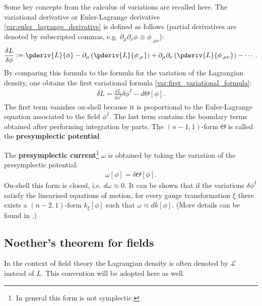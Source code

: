     Some key concepts from the calculus of variations are recalled here. The variational derivative or Euler-Lagrange derivative \eqref{var:euler_lagrange_derivative} is defined as follows (partial derivatives are denoted by subscripted commas, e.g. $\partial_\mu\partial_\nu\phi\equiv\phi_{,\mu\nu}$):
    \begin{gather}
        \frac{\delta L}{\delta \phi} := \pderiv{L}{\phi} - \partial_\mu\left(\pderiv{L}{\phi_{,\mu}}\right) + \partial_\mu\partial_\nu\left(\pderiv{L}{\phi_{,\mu\nu}}\right) -\cdots.
    \end{gather}
    By comparing this formula to the formula for the variation of the Lagrangian density, one obtains the first variational formula \eqref{var:first_variational_formula}:
    \begin{gather}
        \delta L = \frac{\delta L}{\delta \phi^I}\delta\phi^I - d\Theta[\phi].
    \end{gather}
    The first term vanishes on-shell because it is proportional to the Euler-Lagrange equation associated to the field $\phi^I$. The last term contains the boundary terms obtained after performing integration by parts. The $(n-1,1)$-form $\Theta$ is called the \textbf{presymplectic potential}.

    The \textbf{presymplectic current}\footnote{In general this form is not symplectic.} $\omega$ is obtained by taking the variation of the presymplectic potential:
    \begin{gather}
        \omega[\phi] = \delta\Theta[\phi].
    \end{gather}
    On-shell this form is closed, i.e. $d\omega\approx0$. It can be shown that if the variations $\delta\phi^I$ satisfy the linearised equations of motion, for every gauge transformation $\xi$ there exists a $(n-2,1)$-form $k_\xi[\phi]$ such that $\omega\approx dk[\phi]$. (More details can be found in \cite{compere}.)

\subsection{Noether's theorem for fields}

    In the context of field theory the Lagrangian density is often denoted by $\mathcal{L}$ instead of $L$. This convention will be adopted here as well.

